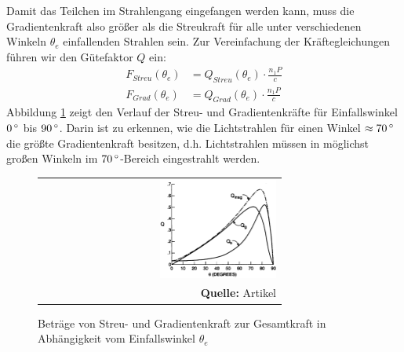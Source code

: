 \documentclass[a4paper,titlepage]{scrartcl}
\numberwithin{equation}{section}
\begin{document}
Damit das Teilchen im Strahlengang eingefangen werden kann, muss die Gradientenkraft also größer als die Streukraft für alle unter verschiedenen Winkeln $\theta_e$ einfallenden Strahlen sein. Zur Vereinfachung der Kräftegleichungen führen wir den Gütefaktor $Q$ ein:
\begin{align*}
F_{Streu}(\theta_e)&=Q_{Streu}(\theta_e) \cdot \frac{n_1 P}{c}\\
F_{Grad}(\theta_e)&=Q_{Grad}(\theta_e) \cdot \frac{n_1 P}{c}
\end{align*}
Abbildung \ref{fig:guetefaktor} zeigt den Verlauf der Streu- und Gradientenkräfte für Einfallswinkel $\unit[0]{^\circ}$ bis $\unit[90]{^\circ}$. Darin ist zu erkennen, wie die Lichtstrahlen für einen Winkel $\approx \unit[70]{^\circ}$ die größte Gradientenkraft besitzen, d.h. Lichtstrahlen müssen in möglichst großen Winkeln im $\unit[70]{^\circ}$-Bereich eingestrahlt werden.
\begin{figure}[H]
	\centering
	\begin{tabular}{@{}r@{}}
		\includegraphics[width=0.5\textwidth]{guetefaktor.png}\\
		\footnotesize\sffamily\textbf{Quelle:} Artikel \cite{ashkin1992}
	\end{tabular}
	\caption{Beträge von Streu- und Gradientenkraft zur Gesamtkraft in Abhängigkeit vom Einfallswinkel $\theta_e$}
    \label{fig:guetefaktor}
\end{figure}
\end{document}
